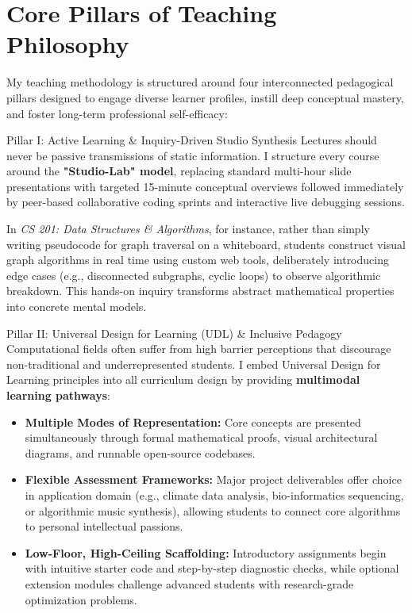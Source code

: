 \documentclass[11pt,a4paper]{article}
\begin{document}
\vspace{3pt}

\section{Core Pillars of Teaching Philosophy}

My teaching methodology is structured around four interconnected pedagogical pillars designed to engage diverse learner profiles, instill deep conceptual mastery, and foster long-term professional self-efficacy:

\begin{pillarbox}{Pillar I: Active Learning \& Inquiry-Driven Studio Synthesis}
  Lectures should never be passive transmissions of static information. I structure every course around the \textbf{"Studio-Lab" model}, replacing standard multi-hour slide presentations with targeted 15-minute conceptual overviews followed immediately by peer-based collaborative coding sprints and interactive live debugging sessions. 
  
  In \textit{CS 201: Data Structures \& Algorithms}, for instance, rather than simply writing pseudocode for graph traversal on a whiteboard, students construct visual graph algorithms in real time using custom web tools, deliberately introducing edge cases (e.g., disconnected subgraphs, cyclic loops) to observe algorithmic breakdown. This hands-on inquiry transforms abstract mathematical properties into concrete mental models.
\end{pillarbox}

\vspace{2pt}

\begin{pillarbox}{Pillar II: Universal Design for Learning (UDL) \& Inclusive Pedagogy}
  Computational fields often suffer from high barrier perceptions that discourage non-traditional and underrepresented students. I embed Universal Design for Learning principles into all curriculum design by providing \textbf{multimodal learning pathways}:
  \begin{itemize}[leftmargin=1.5em, labelsep=0.5em, itemsep=2pt, topsep=2pt]
    \item \textbf{Multiple Modes of Representation:} Core concepts are presented simultaneously through formal mathematical proofs, visual architectural diagrams, and runnable open-source codebases.
    \item \textbf{Flexible Assessment Frameworks:} Major project deliverables offer choice in application domain (e.g., climate data analysis, bio-informatics sequencing, or algorithmic music synthesis), allowing students to connect core algorithms to personal intellectual passions.
    \item \textbf{Low-Floor, High-Ceiling Scaffolding:} Introductory assignments begin with intuitive starter code and step-by-step diagnostic checks, while optional extension modules challenge advanced students with research-grade optimization problems.
  \end{itemize}
\end{pillarbox}
\end{document}
